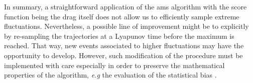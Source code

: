 \documentclass{jfm}
\newcommand{\EL}[1]{{\color{myred}{#1}}}
\begin{document}
%
In summary, a straightforward application of the \ac{ams} algorithm with the score function being the drag itself does not allow us to efficiently sample extreme fluctuations.
%
%
%
%
%
\EL{The phenomenology described before is independent of the choice of $N$ and $T_a$. Increasing the size of the initial ensemble, or the duration of each trajectory, can only increase the amplitude of the global maximum reached initially, but does not solve the issue of overlapping trajectories. }
Nevertheless, a possible line of improvement might be to explicitly \EL{account for the correlation time of the observable being smaller than the Lyapunov time of the system} by re-sampling the trajectories at a Lyapunov time {before} the maximum is reached. That way, new events associated to higher fluctuations may have the opportunity to develop.
However, such modification of the procedure must be implemented with care especially in order to preserve the mathematical properties of the algorithm, \emph{e.g} the evaluation of the statistical bias .
% 
\end{document}
